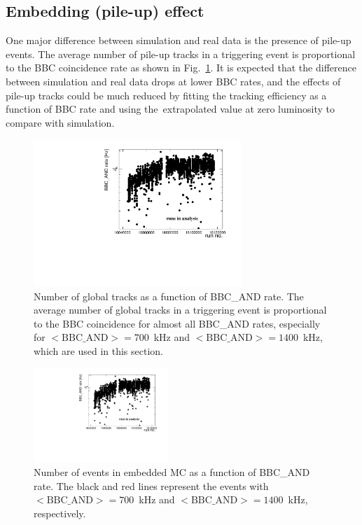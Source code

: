 \subsection{Embedding (pile-up) effect}\label{subsec:TpcEffSystPileUp}
One major difference between simulation and real data is the presence of pile-up
events. The average number of pile-up tracks in
a triggering event is proportional to the BBC coincidence rate as shown in Fig.~\ref{fig:events_bbc_and_meanGlobalTracks}. It is expected that
the difference between simulation and real data drops at lower BBC rates, and the
effects of pile-up tracks could be much reduced by fitting the tracking efficiency as a
function of BBC rate and using the~extrapolated value at zero luminosity to compare
with simulation.
\begin{figure}[!h]
		\centering
		\includegraphics[width=0.7\textwidth, page=9]{graphics/systematicsEfficiency/bbc_and/Out.pdf}
		\caption[Number of global tracks as a function of BBC\_AND rate.]
		{Number of global tracks as a function of BBC\_AND rate. The average number of global tracks in a triggering event is proportional to the BBC coincidence for almost all BBC\_AND rates, especially for  \mbox{$<\text{BBC\_AND}>=700$~kHz} and \mbox{$<\text{BBC\_AND}>=1400$~kHz}, which are used in this section.}
		\label{fig:events_bbc_and_meanGlobalTracks}%
\end{figure}
\newline
\begin{figure}\vspace*{-9pt}
	\centering
	\includegraphics[width=0.45\textwidth, page=5]{graphics/systematicsEfficiency/bbc_and/Out.pdf}
	\caption[Number of events in embedded MC as a function of BBC\_AND rate.]
	{Number of events in embedded MC as a function of BBC\_AND rate. The black and red lines represent the events with \mbox{$<\text{BBC\_AND}>=700$~kHz} and \mbox{$<\text{BBC\_AND}>=1400$~kHz},  respectively.}
	\label{fig:events_bbc_and}%
\end{figure}
